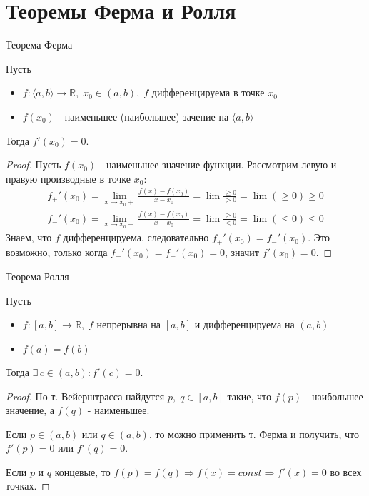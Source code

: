 \section{Теоремы Ферма и Ролля}
\begin{theorem-non}
    Теорема Ферма

    Пусть
    \begin{itemize}
        \item $f: \langle a, b \rangle \to \mathbb{R}, \; x_0 \in (a, b), \; f$ дифференцируема в точке $x_0$
        \item $f(x_0)$ - наименьшее (наибольшее) зачение на $\langle a, b \rangle$
    \end{itemize}
    Тогда $f'(x_0) = 0$.
\end{theorem-non}
\begin{proof}
    Пусть $f(x_0)$ - наименьшее значение функции. Рассмотрим левую и правую производные в точке $x_0$:
    \begin{gather*}
        f_+'(x_0) = \lim_{x \to x_0+} \frac{f(x) - f(x_0)}{x - x_0} = \lim \frac{\geqslant 0}{> 0} = \lim (\geqslant 0) \geqslant 0 \\
        f_-'(x_0) = \lim_{x \to x_0-} \frac{f(x) - f(x_0)}{x - x_0} = \lim \frac{\geqslant 0}{< 0} = \lim (\leqslant 0) \leqslant 0 
    \end{gather*}   
    Знаем, что $f$ дифференцируема, следовательно $f_+'(x_0) = f_-'(x_0)$. Это возможно, только когда $f_+'(x_0) = f_-'(x_0) = 0$, значит $f'(x_0) = 0$.
\end{proof}

\begin{theorem-non}
    Теорема Ролля

    Пусть 
    \begin{itemize}
        \item $f: [a, b] \to \mathbb{R}, \; f$ непрерывна на $[a, b]$ и дифференцируема на $(a, b)$
        \item $f(a) = f(b)$
    \end{itemize}
    Тогда $\exists \, c \in (a, b) : f'(c) = 0$.
\end{theorem-non}
\begin{proof}
    По т. Вейерштрасса найдутся $p, \; q \in [a, b]$ такие, что $f(p)$ - наибольшее значение, а $f(q)$ - наименьшее.
    
    Если $p \in (a, b)$ или $q \in (a, b)$, то можно применить т. Ферма и получить, что $f'(p) = 0$ или $f'(q) = 0$.

    Если $p$ и $q$ концевые, то $f(p) = f(q) \Rightarrow f(x) = const \Rightarrow f'(x) = 0$ во всех точках.
\end{proof}
